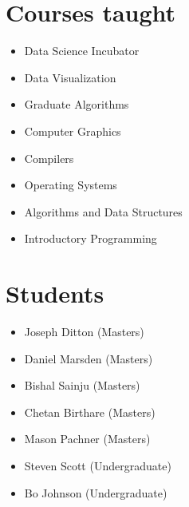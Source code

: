 \documentclass[margin,line]{res}
\begin{document}
\begin{resume}
\begin{LONG}
\section{\sc Courses taught}

\begin{itemize}[label={},leftmargin=0mm]
  \setlength\itemsep{0em}
  \item Data Science Incubator
  \item Data Visualization
  \item Graduate Algorithms
  \item Computer Graphics
  \item Compilers
  \item Operating Systems
  \item Algorithms and Data Structures
  \item Introductory Programming
\end{itemize}


\section{\sc Students}
\begin{itemize}[label={},leftmargin=0pt]
  \setlength\itemsep{0em}
  \item Joseph Ditton (Masters)
  \item Daniel Marsden (Masters)
  \item Bishal Sainju (Masters)
  \item Chetan Birthare (Masters)
  \item Mason Pachner (Masters)
  \item Steven Scott (Undergraduate)
  \item Bo Johnson (Undergraduate)
\end{itemize}


\end{LONG}
\end{resume}
\end{document}
